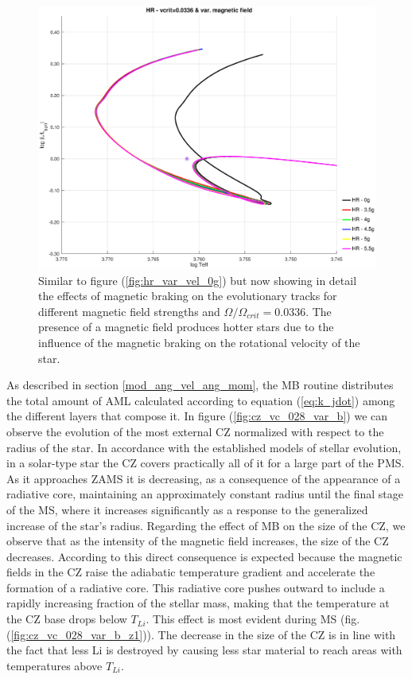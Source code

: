 \documentclass[fleqn,usenatbib]{mnras}
\begin{document}
\begin{figure}
	\includegraphics[trim = 30mm 15mm 15mm 15mm, clip,width=\columnwidth]{figures/hr_vc_0336_var_g_z1.eps}
    \caption{Similar to figure (\ref{fig:hr_var_vel_0g}) but now showing in detail the effects of magnetic braking on the evolutionary tracks for different magnetic field strengths and $\Omega / \Omega_{crit}=0.0336$. The presence of a magnetic field produces hotter stars due to the influence of the magnetic braking on the rotational velocity of the star.}
    \label{hr_vc_0336_var_g_z1}
\end{figure}



As described in section \ref{mod_ang_vel_ang_mom}, the MB routine distributes the total amount of AML calculated according to equation (\ref{eq:k_jdot}) among the different layers that compose it. In figure (\ref{fig:cz_vc_028_var_b}) we can observe the evolution of the most external CZ normalized with respect to the radius of the star. In accordance with the established models of stellar evolution, in a solar-type star the CZ covers practically all of it for a large part of the PMS. As it approaches ZAMS it is decreasing, as a consequence of the appearance of a radiative core, maintaining an approximately constant radius until the final stage of the MS, where it increases significantly as a response to the generalized increase of the star's radius. Regarding the effect of MB on the size of the CZ, we observe that as the intensity of the magnetic field increases, the size of the CZ decreases. According to \citet{Jeffries2004} this direct consequence is expected because the magnetic fields in the CZ raise the adiabatic temperature gradient and accelerate the formation of a radiative core. This radiative core pushes outward to include a rapidly increasing fraction of the stellar mass, making that the temperature at the CZ base drops below $T_{Li}$. This effect is most evident during MS (fig. (\ref{fig:cz_vc_028_var_b_z1})). The decrease in the size of the CZ is in line with the fact that less Li is destroyed by causing less star material to reach areas with temperatures above $T_{Li}$.\par
\end{document}
